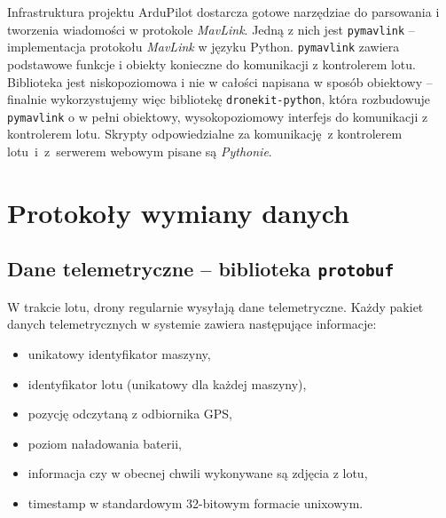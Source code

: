 Infrastruktura projektu ArduPilot dostarcza gotowe narzędziae do
parsowania i tworzenia wiadomości w protokole \textit{MavLink}.
Jedną z nich jest \texttt{pymavlink} -- implementacja protokołu \textit{MavLink} 
w języku Python. \texttt{pymavlink} zawiera podstawowe funkcje i obiekty konieczne
do komunikacji z kontrolerem lotu. Biblioteka jest niskopoziomowa i nie w całości
napisana w sposób obiektowy -- finalnie wykorzystujemy więc bibliotekę
\texttt{dronekit-python}\cite{dronekit_python}, która rozbudowuje \texttt{pymavlink}
o w pełni obiektowy, wysokopoziomowy interfejs do komunikacji z kontrolerem lotu. 
Skrypty odpowiedzialne za komunikację~z kontrolerem lotu~i~z~serwerem webowym
pisane są \textit{Pythonie}.

\section{Protokoły wymiany danych}

\subsection{Dane telemetryczne -- biblioteka \texttt{protobuf}} \label{protobuf_chapter}


W trakcie lotu, drony regularnie wysyłają dane telemetryczne. Każdy pakiet
danych telemetrycznych w systemie zawiera następujące informacje:
\begin{itemize}
	\item unikatowy identyfikator maszyny,
	\item identyfikator lotu (unikatowy dla każdej maszyny),
	\item pozycję odczytaną z odbiornika GPS,
	\item poziom naładowania baterii,
	\item informacja czy w obecnej chwili wykonywane są zdjęcia z lotu,
	\item timestamp w standardowym 32-bitowym formacie unixowym.
\end{itemize}

